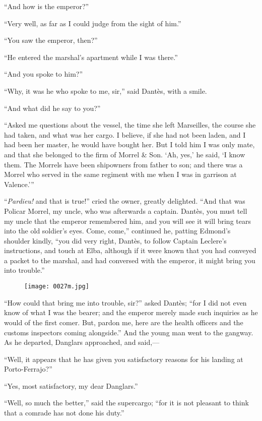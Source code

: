 “And how is the emperor?”

“Very well, as far as I could judge from the sight of him.”

“You saw the emperor, then?”

“He entered the marshal’s apartment while I was there.”

“And you spoke to him?”

“Why, it was he who spoke to me, sir,” said Dantès, with a smile.

“And what did he say to you?”

“Asked me questions about the vessel, the time she left Marseilles, the
course she had taken, and what was her cargo. I believe, if she had not
been laden, and I had been her master, he would have bought her. But I
told him I was only mate, and that she belonged to the firm of Morrel \&
Son. ‘Ah, yes,’ he said, ‘I know them. The Morrels have been shipowners
from father to son; and there was a Morrel who served in the same
regiment with me when I was in garrison at Valence.’”

“\textit{Pardieu!} and that is true!” cried the owner, greatly delighted. “And
that was Policar Morrel, my uncle, who was afterwards a captain.
Dantès, you must tell my uncle that the emperor remembered him, and you
will see it will bring tears into the old soldier’s eyes. Come, come,”
continued he, patting Edmond’s shoulder kindly, “you did very right,
Dantès, to follow Captain Leclere’s instructions, and touch at Elba,
although if it were known that you had conveyed a packet to the
marshal, and had conversed with the emperor, it might bring you into
trouble.”

\begin{figure}[ht]
\texttt{[image: 0027m.jpg]}
\end{figure}

“How could that bring me into trouble, sir?” asked Dantès; “for I did
not even know of what I was the bearer; and the emperor merely made
such inquiries as he would of the first comer. But, pardon me, here are
the health officers and the customs inspectors coming alongside.” And
the young man went to the gangway. As he departed, Danglars approached,
and said,—

“Well, it appears that he has given you satisfactory reasons for his
landing at Porto-Ferrajo?”

“Yes, most satisfactory, my dear Danglars.”

“Well, so much the better,” said the supercargo; “for it is not
pleasant to think that a comrade has not done his duty.”

